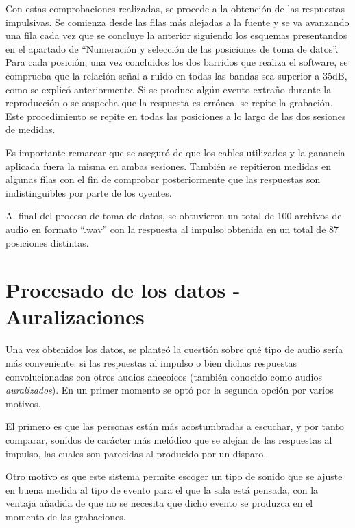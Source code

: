 \documentclass[11pt,a4paper]{book}
\begin{document}
            Con estas comprobaciones realizadas, se procede a la obtención de las respuestas impulsivas. Se comienza desde las filas más alejadas a la fuente y se va avanzando una fila cada vez que se concluye la anterior siguiendo los esquemas presentandos en el apartado de ``Numeración y selección de las posiciones de toma de datos''. Para cada posición, una vez concluidos los dos barridos que realiza el software, se comprueba que la relación señal a ruido en todas las bandas sea superior a 35dB, como se explicó anteriormente. Si se produce algún evento extraño durante la reproducción o se sospecha que la respuesta es errónea, se repite la grabación. Este procedimiento se repite en todas las posiciones a lo largo de las dos sesiones de medidas.
        
            Es importante remarcar que se aseguró de que los cables utilizados y la ganancia aplicada fuera la misma en ambas sesiones. También se repitieron medidas en algunas filas con el fin de comprobar posteriormente que las respuestas son indistinguibles por parte de los oyentes.
        
            Al  final del proceso de toma de datos, se obtuvieron un total de 100 archivos de audio en formato ``.wav'' con la respuesta al impulso obtenida en un total de 87 posiciones distintas.
            
            \section{Procesado de los datos - Auralizaciones}
                Una vez obtenidos los datos, se planteó la cuestión sobre qué tipo de audio sería más conveniente: si las respuestas al impulso o bien dichas respuestas convolucionadas con otros audios anecoicos (también conocido como audios \textit{auralizados}). En un primer momento se optó por la segunda opción por varios motivos.
        
                El primero es que las personas están más acostumbradas a escuchar, y por tanto comparar, sonidos de carácter más melódico que se alejan de las respuestas al impulso, las cuales son parecidas al producido por un disparo.
        
                Otro motivo es que este sistema permite escoger un tipo de sonido que se ajuste en buena medida al tipo de evento para el que la sala está pensada, con la ventaja añadida de que no se necesita que dicho evento se produzca en el momento de las grabaciones.
        
\end{document}
